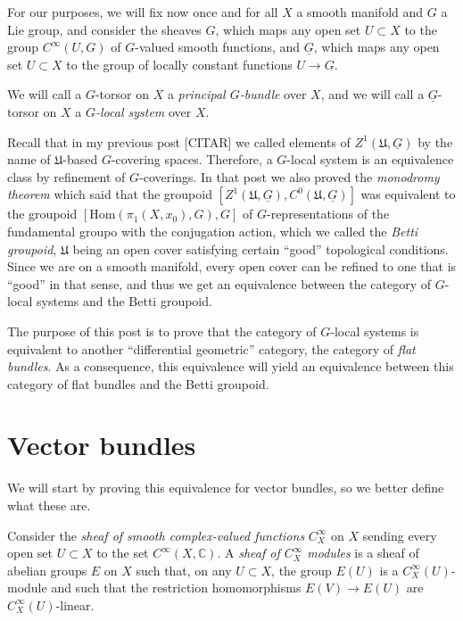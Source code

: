 \documentclass[]{article}
\begin{document}
For our purposes, we will fix now once and for all \(X\) a smooth
manifold and \(G\) a Lie group, and consider the sheaves \(G\), which
maps any open set \(U\subset X\) to the group \(C^\infty(U,G)\) of
\(G\)-valued smooth functions, and \(\underline{G}\), which maps any
open set \(U\subset X\) to the group of locally constant functions
\(U\rightarrow G\).

We will call a \(G\)-torsor on \(X\) a \emph{principal \(G\)-bundle}
over \(X\), and we will call a \(\underline{G}\)-torsor on \(X\) a
\emph{\(G\)-local system} over \(X\).

Recall that in my previous post {[}CITAR{]} we called elements of
\(Z^1(\mathfrak{U},\underline{G})\) by the name of
\(\mathfrak{U}\)-based \(G\)-covering spaces. Therefore, a \(G\)-local
system is an equivalence class by refinement of \(G\)-coverings. In that
post we also proved the \emph{monodromy theorem} which said that the
groupoid
\([Z^1(\mathfrak{U},\underline{G}),C^0(\mathfrak{U},\underline{G})]\)
was equivalent to the groupoid \([\mathrm{Hom}(\pi_1(X,x_0),G),G]\) of
\(G\)-representations of the fundamental groupo with the conjugation
action, which we called the \emph{Betti groupoid}, \(\mathfrak{U}\)
being an open cover satisfying certain ``good'' topological conditions.
Since we are on a smooth manifold, every open cover can be refined to
one that is ``good'' in that sense, and thus we get an equivalence
between the category of \(G\)-local systems and the Betti groupoid.

The purpose of this post is to prove that the category of \(G\)-local
systems is equivalent to another ``differential geometric'' category,
the category of \emph{flat bundles}. As a consequence, this equivalence
will yield an equivalence between this category of flat bundles and the
Betti groupoid.

\section{Vector bundles}\label{vector-bundles}

We will start by proving this equivalence for vector bundles, so we
better define what these are.

Consider the \emph{sheaf of smooth complex-valued functions}
\(C^\infty_X\) on \(X\) sending every open set \(U\subset X\) to the set
\(C^\infty(X,\mathbb{C})\). A \emph{sheaf of \(C^\infty_X\) modules} is
a sheaf of abelian groups \(E\) on \(X\) such that, on any
\(U\subset X\), the group \(E(U)\) is a \(C^\infty_X(U)\)-module and
such that the restriction homomorphisms \(E(V) \rightarrow E(U)\) are
\(C^\infty_X(U)\)-linear.
\end{document}
